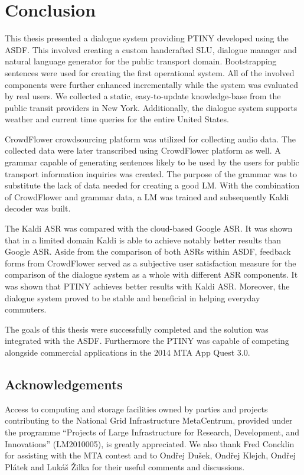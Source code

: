 \chapter*{Conclusion}

This thesis presented a dialogue system providing \acf{PTINY} developed using the \acf{ASDF}.
This involved creating a custom handcrafted \acf{SLU}, dialogue manager and natural language generator for the public transport domain.
Bootstrapping sentences were used for creating the first operational system.
All of the involved components were further enhanced incrementally while the system was evaluated by real users.
We collected a static, easy-to-update knowledge-base from the public transit providers in New York.
Additionally, the dialogue system supports weather and current time queries for the entire United States.

CrowdFlower crowdsourcing platform was utilized for collecting audio data.
The collected data were later transcribed using CrowdFlower platform as well.
A grammar capable of generating sentences likely to be used by the users for public transport information inquiries was created.
The purpose of the grammar was to substitute the lack of data needed for creating a good \acf{LM}.
With the combination of CrowdFlower and grammar data, a \ac{LM} was trained and subsequently Kaldi decoder was built.

The Kaldi \ac{ASR} was compared with the cloud-based Google \ac{ASR}.
It was shown that in a limited domain Kaldi is able to achieve notably better results than Google \ac{ASR}.
Aside from the comparison of both \acp{ASR} within \ac{ASDF}, feedback forms from CrowdFlower served as a subjective user satisfaction measure for the comparison of the dialogue system as a whole with different \ac{ASR} components.
It was shown that \ac{PTINY} achieves better results with Kaldi \ac{ASR}.
Moreover, the dialogue system proved to be stable and beneficial in helping everyday commuters.

The goals of this thesis were successfully completed and the solution was integrated with the \ac{ASDF}.
Furthermore the \ac{PTINY} was capable of competing alongside commercial applications in the 2014 \ac{MTA} App Quest 3.0.


\section{Acknowledgements}

Access to computing and storage facilities owned by parties and projects contributing to the National Grid Infrastructure MetaCentrum, provided under the programme ``Projects of Large Infrastructure for Research, Development, and Innovations'' (LM2010005), is greatly appreciated. We also thank Fred Concklin for assisting with the \ac{MTA} contest and to Ondřej Dušek, Ondřej Klejch, Ondřej Plátek and Lukáš Žilka for their useful comments and discussions.


